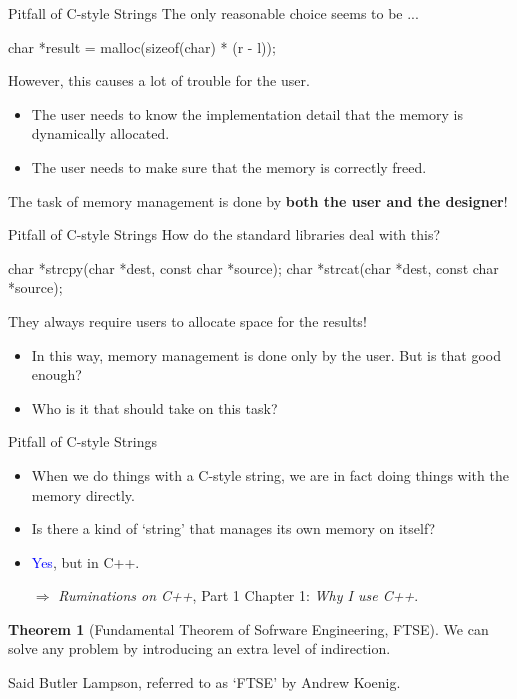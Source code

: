 \documentclass[handout]{beamer}
\newcommand{\blue}[1]{\textcolor{blue}{#1}}
\theoremstyle{definition}
\newtheorem{thm}{Theorem}
\begin{document}
\begin{frame}[fragile]{Pitfall of C-style Strings}
    The only reasonable choice seems to be ...
    \begin{cpp}
char *result = malloc(sizeof(char) * (r - l));
    \end{cpp}
    \pause
    However, this causes a lot of trouble for the user.
    \begin{itemize}
        \item The user needs to know the implementation detail that the memory is dynamically allocated.
        \item The user needs to make sure that the memory is correctly freed.
    \end{itemize}
    \pause
    The task of memory management is done by \textbf{both the user and the designer}!
\end{frame}

\begin{frame}[fragile]{Pitfall of C-style Strings}
    How do the standard libraries deal with this?
    \pause
    \begin{cpp}
char *strcpy(char *dest, const char *source);
char *strcat(char *dest, const char *source);
    \end{cpp}
    They always require users to allocate space for the results!
    \pause
    \begin{itemize}
        \item In this way, memory management is done only by the user. But is that good enough?
        \item Who is it that should take on this task?
    \end{itemize}
\end{frame}

\begin{frame}[fragile]{Pitfall of C-style Strings}
    \begin{itemize}
        \item When we do things with a C-style string, we are in fact doing things with the memory directly.
        \item Is there a kind of `string' that manages its own memory on itself?
        \pause
        \item \blue{Yes}, but in C++.
        \item[\(\Rightarrow\)] \textit{Ruminations on C++}, Part 1 Chapter 1: \textit{Why I use C++}.
    \end{itemize}
    \begin{thm}[Fundamental Theorem of Sofrware Engineering, FTSE]
        We can solve any problem by introducing an extra level of indirection.
    \end{thm}
    Said Butler Lampson, referred to as `FTSE' by Andrew Koenig.
\end{frame}
\end{document}
